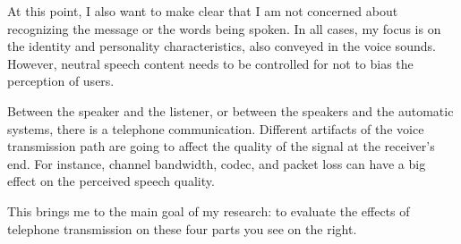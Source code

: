 \documentclass[a4paper]{article}
\begin{document}
At this point, I also want to make clear that I am not concerned about recognizing the message or the words being spoken. In all cases, my focus is on the identity and personality characteristics, also conveyed in the voice sounds. However, neutral speech content needs to be controlled for not to bias the perception of users.

Between the speaker and the listener, or between the speakers and the automatic systems, there is a telephone communication. Different artifacts of the voice transmission path are going to affect the quality of the signal at the receiver's end. For instance, channel bandwidth, codec, and packet loss can have a big effect on the perceived speech quality.

This brings me to the main goal of my research: to evaluate the effects of telephone transmission on these four parts you see on the right. 
\end{document}
